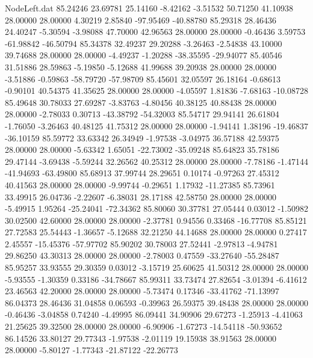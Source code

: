 \begin{filecontents}{NodeLeft.dat}
  85.24246   23.69781   25.14160    -8.42162   -3.51532   50.71250   41.10938   28.00000   28.00000    4.30219    2.85840  -97.95469  -40.88780
  85.29318   28.46436   24.40247    -5.30594   -3.98088   47.70000   42.96563   28.00000   28.00000   -0.46436    3.59753  -61.98842  -46.50794
  85.34378   32.49237   29.20288    -3.26463   -2.54838   43.10000   39.74688   28.00000   28.00000   -4.49237   -1.20288  -38.35595  -29.94077
  85.40546   31.51886   28.59863    -5.19850   -5.12688   41.99688   39.20938   28.00000   28.00000   -3.51886   -0.59863  -58.79720  -57.98709
  85.45601   32.05597   26.18164    -0.68613   -0.90101   40.54375   41.35625   28.00000   28.00000   -4.05597    1.81836   -7.68163  -10.08728
  85.49648   30.78033   27.69287    -3.83763   -4.80456   40.38125   40.88438   28.00000   28.00000   -2.78033    0.30713  -43.38792  -54.32003
  85.54717   29.94141   26.61804    -1.76050   -3.26463   40.48125   41.75312   28.00000   28.00000   -1.94141    1.38196  -19.46837  -36.10159
  85.59772   33.63342   26.34949    -1.97538   -3.04975   36.57188   42.59375   28.00000   28.00000   -5.63342    1.65051  -22.73002  -35.09248
  85.64823   35.78186   29.47144    -3.69438   -5.59244   32.26562   40.25312   28.00000   28.00000   -7.78186   -1.47144  -41.94693  -63.49800
  85.68913   37.99744   28.29651     0.10174   -0.97263   27.45312   40.41563   28.00000   28.00000   -9.99744   -0.29651    1.17932  -11.27385
  85.73961   33.49915   26.04736    -2.22607   -6.38031   28.17188   42.58750   28.00000   28.00000   -5.49915    1.95264  -25.24041  -72.34362
  85.80060   30.37781   27.05444     0.03012   -1.50982   30.02500   42.60000   28.00000   28.00000   -2.37781    0.94556    0.33468  -16.77708
  85.85121   27.72583   25.54443    -1.36657   -5.12688   32.21250   44.14688   28.00000   28.00000    0.27417    2.45557  -15.45376  -57.97702
  85.90202   30.78003   27.52441    -2.97813   -4.94781   29.86250   43.30313   28.00000   28.00000   -2.78003    0.47559  -33.27640  -55.28487
  85.95257   33.93555   29.30359     0.03012   -3.15719   25.60625   41.50312   28.00000   28.00000   -5.93555   -1.30359    0.33186  -34.78667
  85.99311   33.73474   27.82654    -3.01394   -6.41612   23.46563   42.20000   28.00000   28.00000   -5.73474    0.17346  -33.41762  -71.13997
  86.04373   28.46436   31.04858     0.06593   -0.39963   26.59375   39.48438   28.00000   28.00000   -0.46436   -3.04858    0.74240   -4.49995
  86.09441   34.90906   29.67273    -1.25913   -4.41063   21.25625   39.32500   28.00000   28.00000   -6.90906   -1.67273  -14.54118  -50.93652
  86.14526   33.80127   29.77343    -1.97538   -2.01119   19.15938   38.91563   28.00000   28.00000   -5.80127   -1.77343  -21.87122  -22.26773

\end{filecontents}
